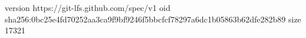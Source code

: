 version https://git-lfs.github.com/spec/v1
oid sha256:0bc25e4fd70252aa3ca9f9bf9246f5bbcfcf78297a6dc1b05863b62dfe282b89
size 17321
